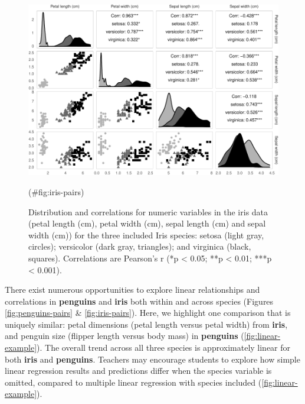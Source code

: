 \begin{Schunk}
\begin{figure}
\includegraphics{penguins_files/figure-latex/iris-pairs-1} \caption[Distribution and correlations for numeric variables in the iris data (petal length (cm), petal width (cm), sepal length (cm) and sepal width (cm)) for the three included Iris species]{Distribution and correlations for numeric variables in the iris data (petal length (cm), petal width (cm), sepal length (cm) and sepal width (cm)) for the three included Iris species: setosa (light gray, circles); versicolor (dark gray, triangles); and virginica (black, squares). Correlations are Pearson's r (*p < 0.05; **p < 0.01; ***p < 0.001).}(\#fig:iris-pairs)
\end{figure}
\end{Schunk}

There exist numerous opportunities to explore linear relationships and correlations in \textbf{penguins} and \textbf{iris} both within and across species (Figures \ref{fig:penguins-pairs} \& \ref{fig:iris-pairs}). Here, we highlight one comparison that is uniquely similar: petal dimensions (petal length versus petal width) from \textbf{iris}, and penguin size (flipper length versus body mass) in \textbf{penguins} (\ref{fig:linear-example}). The overall trend across all three species is approximately linear for both \textbf{iris} and \textbf{penguins}. Teachers may encourage students to explore how simple linear regression results and predictions differ when the species variable is omitted, compared to multiple linear regression with species included (\ref{fig:linear-example}).

